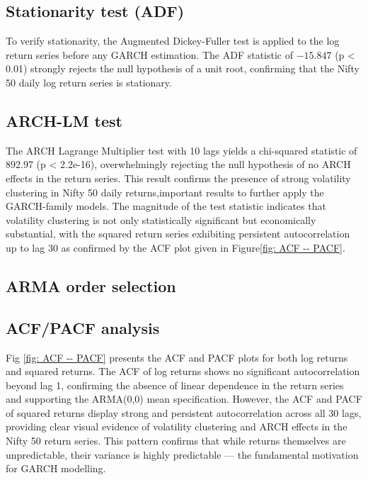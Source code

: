 \vspace{1.5cm}


\subsection{Stationarity test (ADF)}
To verify stationarity, the Augmented Dickey-Fuller test is applied to the log return series  before any GARCH estimation. The ADF statistic of $−15.847$ (p < 0.01) strongly rejects the null hypothesis of a unit root, confirming that the Nifty 50 daily log return series is stationary. 





\subsection{ARCH-LM test}
The ARCH Lagrange Multiplier test with 10 lags yields a chi-squared statistic of 892.97 (p < 2.2e-16), overwhelmingly rejecting the null hypothesis of no ARCH effects in the return series. This result confirms the presence of strong volatility clustering in Nifty 50 daily returns,important results to further apply the GARCH-family models. The magnitude of the test statistic indicates that volatility clustering is not only statistically significant but economically substantial, with the squared return series exhibiting persistent autocorrelation up to lag 30 as confirmed by the ACF plot given in Figure\ref{fig: ACF -- PACF}.

\vspace{1.5cm}

\subsection{ARMA order selection}




\subsection{ACF/PACF analysis}



Fig \ref{fig: ACF -- PACF} presents the ACF and PACF plots for both log returns and squared returns. The ACF of log returns shows no significant autocorrelation beyond lag 1, confirming the absence of linear dependence in the return series and supporting the ARMA(0,0) mean specification. However, the ACF and PACF of squared returns display strong and persistent autocorrelation across all 30 lags, providing clear visual evidence of volatility clustering and ARCH effects in the Nifty 50 return series. This pattern confirms that while returns themselves are unpredictable, their variance is highly predictable — the fundamental motivation for GARCH modelling.


